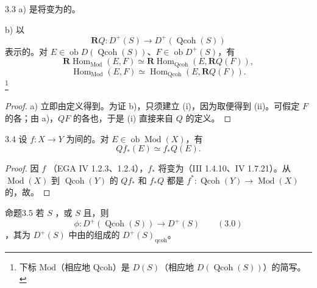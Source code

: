 \begin{SGAresult}{}{3.3}
a) 是将变为的。

b) 以
\[
\mathbf RQ:D^+(S)\longrightarrow D^+(\operatorname{Qcoh}(S))
\]
表示的。对 $E\in\operatorname{ob}D(\operatorname{Qcoh}(S))$、$F\in\operatorname{ob}D^+(S)$，有
\[
\mathbf R\operatorname{Hom}_{\mathrm{Mod}}(E,F)\simeq\mathbf R\operatorname{Hom}_{\mathrm{Qcoh}}(E,\mathbf RQ(F)),\tag{i}
\]
\[
\operatorname{Hom}_{\mathrm{Mod}}(E,F)\simeq\operatorname{Hom}_{\mathrm{Qcoh}}(E,\mathbf RQ(F)).\tag{ii}
\]
\footnote{下标 $\mathrm{Mod}$（相应地 $\mathrm{Qcoh}$）是 $D(S)$（相应地 $D(\operatorname{Qcoh}(S))$）的简写。}
\end{SGAresult}
\begin{proof}
a) 立即由定义得到。为证 b)，只须建立 (i)，因为取便得到 (ii)。可假定 $F$ 的各；由 a)，$QF$ 的各也，于是 (i) 直接来自 $Q$ 的定义。
\end{proof}
\begin{SGAresult}{}{3.4}
设 $f:X\to Y$ 为间的。对 $E\in\operatorname{ob}\operatorname{Mod}(X)$，有
\[
Qf_*(E)\simeq f_*Q(E).
\]
\end{SGAresult}
\begin{proof}
因 $f$ （EGA IV 1.2.3、1.2.4），$f_*$ 将变为（III 1.4.10、IV 1.7.21）。从 $\operatorname{Mod}(X)$ 到 $\operatorname{Qcoh}(Y)$ 的 $Qf_*$ 和 $f_*Q$ 都是 $f^*:\operatorname{Qcoh}(Y)\to\operatorname{Mod}(X)$ 的，故。
\end{proof}
\begin{SGAresult}{命题}{3.5}
若 $S$ ，或 $S$ 且，则
\[
\phi:D^+(\operatorname{Qcoh}(S))\longrightarrow D^+(S)\qquad(3.0)
\]
，其为 $D^+(S)$ 中由的组成的 $D^+(S)_{\mathrm{qcoh}}$。
\end{SGAresult}
